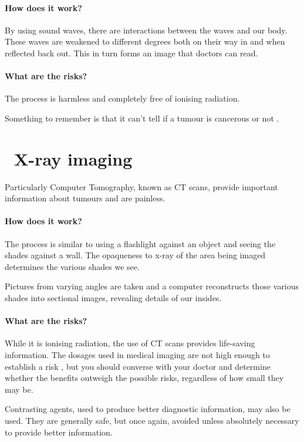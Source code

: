 \documentclass[12pt,nofoldmark,notumble]{leaflet}
\begin{document}
\paragraph{How does it work?}
By using sound waves, there are interactions between the waves and our body.
These waves are weakened to different degrees both on their way in and when reflected back out. This in turn forms an image that doctors can read.

\paragraph{What are the risks?}
The process is harmless and completely free of ionising radiation.

Something to remember is that it can't tell if a tumour is cancerous or not \cite{ACS2020}. 

\section{\faPlusSquare\ X-ray imaging}
Particularly Computer Tomography, known as CT scans, provide important information about tumours and are painless.
\paragraph{How does it work?}
The process is similar to using a flashlight against an object and seeing the shades against a wall.
The opaqueness to x-ray of the area being imaged determines the various shades we see.

Pictures from varying angles are taken and a computer reconstructs those various shades into sectional images, revealing details of our insides.  

\paragraph{What are the risks?}
While it is ionising radiation, the use of CT scans provides life-saving information.
The dosages used in medical imaging are not high enough to establish a risk \cite{ACOG2017}, but you should converse with your doctor and determine whether the benefits outweigh the possible risks, regardless of how small they may be.

Contrasting agents, used to produce better diagnostic information, may also be used.
They are generally safe, but once again, avoided unless absolutely necessary to provide better information. 
 
\end{document}
